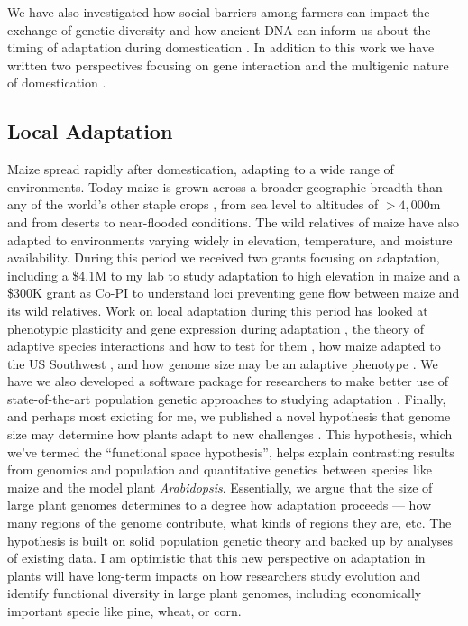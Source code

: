 \documentclass[letterpaper,10pt]{article}
\begin{document}
We have also investigated how social barriers among farmers can impact the exchange  of genetic diversity \cite{orozco2016maize} and how ancient DNA can inform us about the timing of adaptation during domestication \cite{ramos2016genome}.
In addition to this work we have written two perspectives focusing on gene interaction \cite{Stitzer2018} and the multigenic nature of domestication \cite{stetter2018genetic}.

\subsection*{Local Adaptation}
Maize spread rapidly after domestication, adapting to a wide range of environments.
Today maize is grown across a broader geographic breadth than any of the world's other staple crops \cite{hake2015genetic}, from sea level to altitudes of $>4,000$m and from deserts to near-flooded conditions.
The wild relatives of maize have also adapted to environments varying widely in elevation, temperature, and moisture availability.
During this period we received two grants focusing on adaptation, including a \$4.1M to my lab to study adaptation to high elevation in maize and a \$300K grant as Co-PI to understand loci preventing gene flow between maize and its wild relatives.
Work on local adaptation during this period has looked at phenotypic plasticity \cite{lorant2017potential} and gene expression during adaptation \cite{aguilar2017allele}, the theory of adaptive species interactions and how to test for them \cite{o2015evolutionary}, how maize adapted to the US Southwest \cite{swarts2017genomic}, and how genome size may be an adaptive phenotype \cite{bilinski2018parallel}.
We have we also developed a software package for researchers to make better use of state-of-the-art population genetic approaches to studying adaptation \cite{durvasula2016angsd}.
Finally, and perhaps most exicting for me, we published a novel hypothesis that genome size may determine how plants adapt to new challenges \cite{mei2018adaptation}.
This hypothesis, which we've termed the ``functional space hypothesis'', helps explain contrasting results from genomics and population and quantitative genetics between species like maize and the model plant \textit{Arabidopsis}.
Essentially, we argue that the size of large plant genomes determines to a degree how adaptation proceeds --- how many regions of the genome contribute, what kinds of regions they are, etc.
The hypothesis is built on solid population genetic theory and backed up by analyses of existing data.
I am optimistic that this new perspective on adaptation in plants will have long-term impacts on how researchers study evolution and identify functional diversity in large plant genomes, including economically important specie like pine, wheat, or corn.
\end{document}
